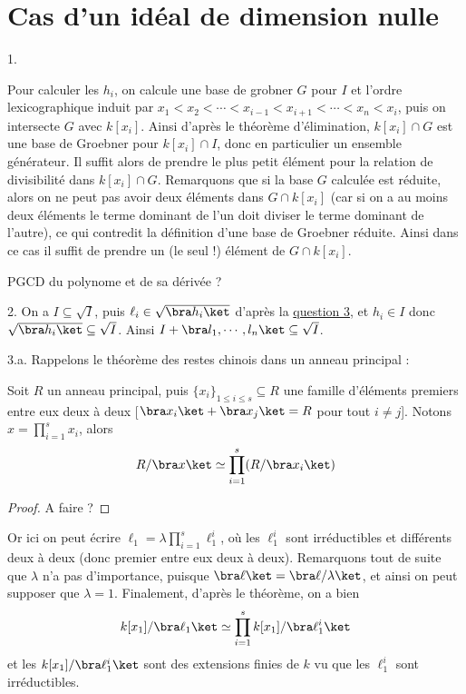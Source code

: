 \documentclass[11pt]{article}
\newcommand{\cor}[1]{{\color{red} #1}}
\begin{document}
\section{Cas d'un idéal de dimension nulle}
    \begin{question}{1.}
        \item Pour calculer les $h_i$, on calcule une base de grobner $G$ pour $I$ et l'ordre lexicographique induit par $x_1 < x_2 < \cdots < x_{i-1} < x_{i+1} < \cdots < x_n < x_i$, puis on intersecte $G$ avec $k[x_i]$. Ainsi d'après le théorème d'élimination, $k[x_i] \cap G$ est une base de Groebner pour $k[x_i] \cap I$, donc en particulier un ensemble générateur. Il suffit alors de prendre le plus petit élément pour la relation de divisibilité dans $k[x_i] \cap G$. Remarquons que si la base $G$ calculée est réduite, alors on ne peut pas avoir deux éléments dans $G \cap k[x_i]$ (car si on a au moins deux éléments le terme dominant de l'un doit diviser le terme dominant de l'autre), ce qui contredit la définition d'une base de Groebner réduite. Ainsi dans ce cas il suffit de prendre un (le seul !) élément de $G \cap k[x_i]$.
        \item \cor{PGCD du polynome et de sa dérivée ?}
    \end{question}
    \begin{question}{2.}
        \label{q22}
        On a $I \subseteq \sqrt{I}$, puis $\ell_i \in \sqrt{\bra h_i \ket}$ d'après la \hyperref[q3]{question 3}, et $h_i \in I$ donc $\sqrt{\bra h_i \ket} \subseteq \sqrt{I}$. Ainsi $I + \bra l_1, \cdots, l_n \ket \subseteq \sqrt{I}$.
    \end{question}
    \begin{question}{3.a.}
        \label{q3a}
        Rappelons le théorème des restes chinois dans un anneau principal :
        \begin{theo}
            \label{theo21}
            Soit $R$ un anneau principal, puis $\{x_i\}_{1 \leq i \leq s} \subseteq R$ une famille d'éléments premiers entre eux deux à deux [$\bra x_i \ket + \bra x_j \ket = R$ pour tout $i \neq j$]. Notons $x = \prod_{i = 1}^s x_i$, alors
            \begin{align*}
                R/\bra x \ket \simeq \prod_{i = 1}^s (R/\bra x_i \ket)
            \end{align*}
        \end{theo}
        \begin{proof}
            \cor{A faire ?}
        \end{proof}
        Or ici on peut écrire $\ell_1 = \lambda \prod_{i = 1}^s \ell_1^i$, où les $\ell_1^i$ sont irréductibles et différents deux à deux (donc premier entre eux deux à deux). Remarquons tout de suite que $\lambda$ n'a pas d'importance, puisque $\bra \ell \ket = \bra \ell/\lambda \ket$, et ainsi on peut supposer que $\lambda = 1$. Finalement, d'après le théorème, on a bien
        \begin{align*}
            k[x_1]/\bra \ell_1 \ket \simeq \prod_{i = 1}^s k[x_1]/\bra \ell_1^i \ket
        \end{align*}
        et les $k[x_1]/\bra \ell_1^i \ket$ sont des extensions finies de $k$ vu que les $\ell_1^i$ sont irréductibles.
    \end{question}
\end{document}
